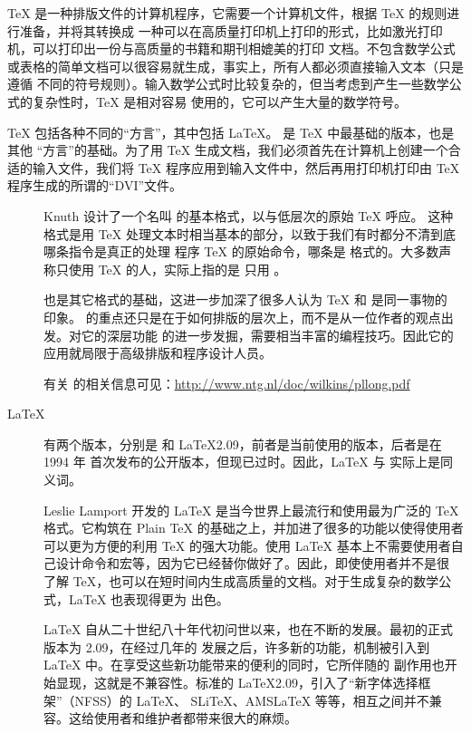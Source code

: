 
\TeX{} 是一种排版文件的计算机程序，它需要一个计算机文件，根据 \TeX{} 的规则进行准备，并将其转换成
一种可以在高质量打印机上打印的形式，比如激光打印机，可以打印出一份与高质量的书籍和期刊相媲美的打印
文档。不包含数学公式或表格的简单文档可以很容易就生成，事实上，所有人都必须直接输入文本（只是遵循
不同的符号规则）。输入数学公式时比较复杂的，但当考虑到产生一些数学公式的复杂性时，\TeX{} 是相对容易
使用的，它可以产生大量的数学符号。

\TeX{} 包括各种不同的“方言”，其中包括 \LaTeX{}。\PlainTeX{} 是 \TeX{} 中最基础的版本，也是其他
“方言”的基础。为了用 \TeX{} 生成文档，我们必须首先在计算机上创建一个合适的输入文件，我们将 \TeX{}
程序应用到输入文件中，然后再用打印机打印由 \TeX{} 程序生成的所谓的“DVI”文件。

\begin{description}
  \item[\PlainTeX] Knuth 设计了一个名叫 \PlainTeX{} 的基本格式，以与低层次的原始 \TeX{} 呼应。
    这种格式是用 \TeX{} 处理文本时相当基本的部分，以致于我们有时都分不清到底哪条指令是真正的处理
    程序 \TeX{} 的原始命令，哪条是 \PlainTeX{} 格式的。大多数声称只使用 \TeX{} 的人，实际上指的是
    只用 \PlainTeX{}。

    \PlainTeX{} 也是其它格式的基础，这进一步加深了很多人认为 \TeX{} 和 \PlainTeX{} 是同一事物的
    印象。\PlainTeX{} 的重点还只是在于如何排版的层次上，而不是从一位作者的观点出发。对它的深层功能
    的进一步发掘，需要相当丰富的编程技巧。因此它的应用就局限于高级排版和程序设计人员。

    有关 \PlainTeX{} 的相关信息可见：\url{http://www.ntg.nl/doc/wilkins/pllong.pdf}

  \item[\LaTeX] 有两个版本，分别是 \LaTeXe{} 和 \LaTeX2.09，前者是当前使用的版本，后者是在 1994 年
    首次发布的公开版本，但现已过时。因此，\LaTeX{} 与 \LaTeXe{} 实际上是同义词。

    Leslie Lamport 开发的 \LaTeX{} 是当今世界上最流行和使用最为广泛的 \TeX{} 格式。它构筑在 Plain
    \TeX{} 的基础之上，并加进了很多的功能以使得使用者可以更为方便的利用 \TeX{} 的强大功能。使用
    \LaTeX{} 基本上不需要使用者自己设计命令和宏等，因为它已经替你做好了。因此，即使使用者并不是很
    了解 \TeX{}，也可以在短时间内生成高质量的文档。对于生成复杂的数学公式，\LaTeX{} 也表现得更为
    出色。

    \LaTeX{} 自从二十世纪八十年代初问世以来，也在不断的发展。最初的正式版本为 2.09，在经过几年的
    发展之后，许多新的功能，机制被引入到 \LaTeX{} 中。在享受这些新功能带来的便利的同时，它所伴随的
    副作用也开始显现，这就是不兼容性。标准的 \LaTeX2.09，引入了“新字体选择框架”（NFSS）的 \LaTeX{}、
    SLiTeX、AMSLaTeX 等等，相互之间并不兼容。这给使用者和维护者都带来很大的麻烦。


\end{description}
